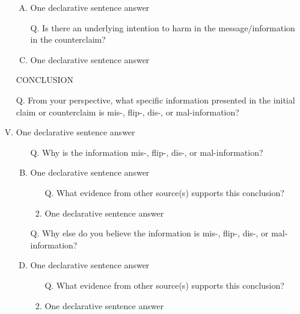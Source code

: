 \documentclass[a4paper, 12pt]{article}
\begin{document}
\begin{enumerate}[I.]
\begin{enumerate}[A.]
              \item {\color{gray} One declarative sentence answer}
              \item [Q.] Is there an underlying intention to harm in the message/information in the {\color{red}counterclaim}?
              \item {\color{gray} One declarative sentence answer}
          \end{enumerate}
    \item [] %
    \item [] CONCLUSION
    \item [Q.] From your perspective, what specific information presented in the {\color{blue}initial claim} or {\color{red}counterclaim}
          is {\color{blue} mis}-, {\color{blue}flip}-, {\color{blue}dis}-, or {\color{blue}mal}-information?
    \item {\color{gray} One declarative sentence answer} %
          \begin{enumerate}[A.]
              \item [Q.] Why is the information {\color{blue} mis}-, {\color{blue}flip}-, {\color{blue}dis}-, or {\color{blue}mal}-information?
              \item {\color{gray} One declarative sentence answer} %
                    \begin{enumerate}[1.]
                        \item [Q.] What evidence from other source(s) supports this conclusion?
                        \item {\color{gray} One declarative sentence answer} %
                    \end{enumerate}
              \item [Q.] Why else do you believe the information is {\color{blue} mis}-, {\color{blue}flip}-, {\color{blue}dis}-, or {\color{blue}mal}-information?
              \item {\color{gray} One declarative sentence answer} %
                    \begin{enumerate}[1.]
                        \item [Q.] What evidence from other source(s) supports this conclusion?
                        \item {\color{gray} One declarative sentence answer} %
                    \end{enumerate}
          \end{enumerate}
\end{enumerate}

\end{document}
